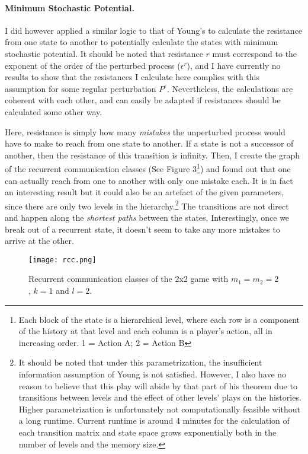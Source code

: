\documentclass[11pt, a4paper, leqno]{article}
\begin{document}
\paragraph{Minimum Stochastic Potential.}

I did however applied a similar logic to that of Young's to calculate the resistance from one state to another to potentially calculate the states with minimum stochastic potential. It should be noted that resistance $r$ must correspond to the exponent of the order of the perturbed process ($\epsilon^r$), and I have currently no results to show that the resistances I calculate here complies with this assumption for some regular perturbation $P^\epsilon$. Nevertheless, the calculations are coherent with each other, and can easily be adapted if resistances should be calculated some other way.

Here, resistance is simply how many \textit{mistakes} the unperturbed process would have to make to reach from one state to another. If a state is not a successor of another, then the resistance of this transition is infinity. Then, I create the graph of the recurrent communication classes (See Figure 3\footnote{Each block of the state is a hierarchical level, where each row is a component of the history at that level and each column is a player's action, all in increasing order. 1 = Action A; 2 = Action B}) and found out that one can actually reach from one to another with only one mistake each. It is in fact an interesting result but it could also be an artefact of the given parameters, since there are only two levels in the hierarchy.\footnote{It should be noted that under this parametrization, the insufficient information assumption of Young is not satisfied. However, I also have no reason to believe that this play will abide by that part of his theorem due to transitions between levels and the effect of other levels' plays on the histories. Higher parametrization is unfortunately not computationally feasible without a long runtime. Current runtime is around 4 minutes for the calculation of each transition matrix and state space grows exponentially both in the number of levels and the memory size.} The transitions are not direct and happen along the \textit{shortest paths} between the states. Interestingly, once we break out of a recurrent state, it doesn't seem to take any more mistakes to arrive at the other. 

\begin{figure}
            \centering
            \texttt{[image: rcc.png]}
            \caption{Recurrent communication classes of the 2x2 game with $m_1=m_2=2$, $k=1$ and $l=2$.}
            \label{fig:rcc}
        \end{figure}
\end{document}
